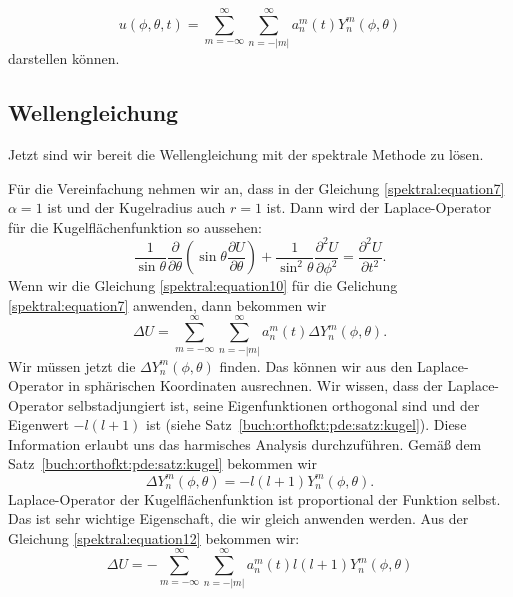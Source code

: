 \begin{equation}
u(\phi,\theta,t) = \sum_{m=-\infty}^{\infty}\sum_{n=-|m|}^{\infty}a_n^m(t)Y_n^m(\phi, \theta)
\label{spektral:equation10}
\end{equation}
darstellen können.

\subsection{Wellengleichung
\label{spektral:subsection:wellengleichung}}
Jetzt sind wir bereit die Wellengleichung mit der spektrale Methode zu lösen.

Für die Vereinfachung nehmen wir an, dass in der Gleichung \eqref{spektral:equation7} $\alpha=1$ ist und der Kugelradius auch $r=1$ ist.
Dann wird der Laplace-Operator für die Kugelflächenfunktion so aussehen:
\begin{equation}
\frac{1}{\sin\theta}\frac{\partial}{\partial{\theta}}\left(\sin\theta\frac{\partial{U}}{\partial{\theta}}\right) + \frac{1}{\sin^2\theta}\frac{\partial^2{U}}{\partial{\phi^2}} = \frac{\partial^2{U}}{\partial{t^2}}.
\label{spektral:equation11}
\end{equation}
Wenn wir die Gleichung \eqref{spektral:equation10} für die Gelichung \eqref{spektral:equation7} anwenden, dann bekommen wir
\begin{equation}
\Delta{U} = \sum_{m=-\infty}^{\infty}\sum_{n=-|m|}^{\infty}a_n^m(t)\Delta{Y_n^m(\phi, \theta)}.
\label{spektral:equation12}
\end{equation}
Wir müssen jetzt die $\Delta{Y_n^m(\phi, \theta)}$ finden.
Das können wir aus den Laplace-Operator in sphärischen Koordinaten ausrechnen. Wir wissen, dass der Laplace-Operator selbstadjungiert ist, seine Eigenfunktionen orthogonal sind und der Eigenwert $-l(l+1)$ ist (siehe Satz~\ref{buch:orthofkt:pde:satz:kugel}).
Diese Information erlaubt uns das harmisches Analysis durchzuführen.
Gemäß dem Satz~\ref{buch:orthofkt:pde:satz:kugel} bekommen wir
\begin{equation}
\Delta{Y_n^m(\phi, \theta)} = -l(l+1)Y_n^m(\phi, \theta).
\label{spektral:equation16}
\end{equation}
Laplace-Operator der Kugelflächenfunktion ist proportional der Funktion selbst. Das ist sehr wichtige Eigenschaft, die wir gleich anwenden werden.
Aus der Gleichung \eqref{spektral:equation12} bekommen wir:
\begin{equation}
\Delta{U} = -\sum_{m=-\infty}^{\infty}\sum_{n=-|m|}^{\infty}a_n^m(t)l(l+1)Y_n^m(\phi, \theta)
\label{spektral:equation17}
\end{equation}

